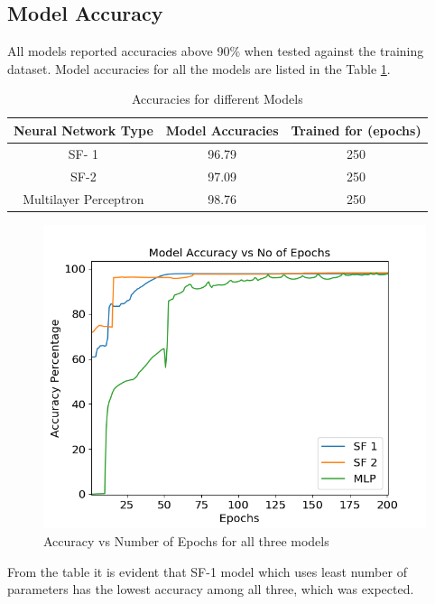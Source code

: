 \documentclass[12pt]{article}
\theoremstyle{definition}
\begin{document}
		\subsection{Model Accuracy}
		All models reported accuracies above 90\% when tested against the training dataset. Model accuracies for all the models are listed in the Table \ref{tab:model-accu}.
		\begin{table}[!h]
			\centering
			\caption{Accuracies for different Models}
			\label{tab:model-accu}
			\begin{tabular}{|c|c|c|}
				\hline
				\textbf{Neural Network Type}      & \textbf{Model Accuracies} & \textbf{Trained for (epochs)} \\ \hline
				SF- 1                 & 96.79                     & 250                  \\ \hline
				SF-2                  & 97.09                     & 250                  \\ \hline
				Multilayer Perceptron & 98.76                     & 250                  \\ \hline
			\end{tabular}
		\end{table}
		\begin{figure}[!h]
			\centering
			\includegraphics[width=400pt]{pictures/all_accuracy.png}
			\caption{Accuracy vs Number of Epochs for all three models}
			\label{fig:sf12-accu}
		\end{figure}
		
		From the table it is evident that SF-1 model which uses least number of parameters has the lowest accuracy among all three, which was expected.
		
\end{document}
